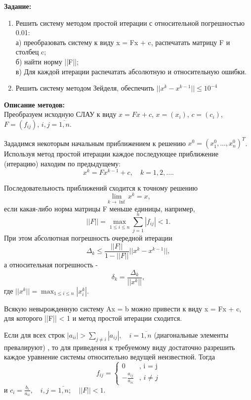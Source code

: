 \documentclass [12pt]{article}
\begin{document}
\textbf{Задание:}

\begin{enumerate}
    \item Решить систему методом простой итерации с относительной погрешностью 0.01:\\
    а) преобразовать систему к виду x = Fx + c, распечатать матрицу F и столбец c;\\
    б) найти норму ||F||;\\
    в) Для каждой итерации распечатать абсолютную и относительную ошибки.
    \item Решить систему методом Зейделя, обеспечить $||x^k - x^{k - 1}|| \leq 10^{-4}$
\end{enumerate}

\textbf{Описание методов:}\\

Преобразуем исходную СЛАУ к виду $x = Fx + c$, $x = (x_{i})$, $c = (c_{i})$, $F = (f_{ij})$, $i,j=\overline{1,n}$.

Зададимся некоторым начальным приближением к решению $x^0 = (x_{1}^0,...,x_{n}^0)^T$. Используя метод простой итерации каждое последующее приближение (итерацию) находим по предыдущему: $$ x^k = Fx^{k-1} + c, \quad k = 1,2,....$$

Последовательность приближений сходится к точному решению $$ \lim_{k\to \inf} x^k = x,$$ если какая-либо норма матрицы F меньше единицы, например, $$ ||F|| = \max_{1 \leq i \leq n} \sum_{j = 1}^{n} |f_{ij}| < 1.$$
При этом абсолютная погрешность очередной итерации $$ \Delta_{k} \leq \frac{||F||}{1 - ||F||}||x^k - x^{k-1}||,$$ а относительная погрешность - $$ \delta_{k} = \frac{\Delta_{k}}{||x^k||},$$ где $ ||x^k|| = \max_{1 \leq i \leq n} |x_{i}^k|$.

Всякую невырожденную систему Ax = b можно привести к виду x = Fx + c, для которого ||F|| < 1 и метод простой итерации сходится.

Если для всех строк $|a_{ii}| > \sum\limits_{j \neq i}{|a_{ij}|}, \quad i = \overline{1,n}$ (диагональные элементы превалируют) , то для приведения к требуемому виду достаточно разрешить каждое уравнение системы относительно ведущей неизвестной. Тогда
\begin{equation*}
    f_{ij} =
    \begin{cases}
       0 &\text{, i = j}\\
       -\frac{a_{ij}}{a_{ii}} &\text{, $i \neq j$}
    \end{cases}
\end{equation*}
и $ c_{i} = \frac{b_{i}}{a_{ii}}, \quad i,j = \overline{1,n}; \quad ||F|| < 1 $.
\end{document}
